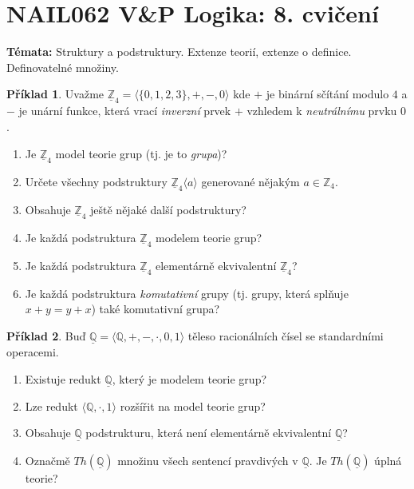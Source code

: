 \documentclass[a4paper]{article}
\theoremstyle{definition}
\newtheorem{problem}{Příklad}
\begin{document}
\section*{NAIL062 V\&P Logika: 8. cvičení}


\textbf{Témata:}
Struktury a podstruktury. Extenze teorií, extenze o definice. Definovatelné množiny.


\medskip\begin{problem}
    Uvažme $\underline{\mathbb{Z}}_4=\langle\{0,1,2,3\},+,-,0 \rangle$ kde $+$ je binární sčítání modulo $4$ a $-$ je unární funkce, která vrací \emph{inverzní} prvek $+$ vzhledem k \emph{neutrálnímu} prvku $0$.
    \begin{enumerate}[label=(\alph*),noitemsep,topsep=6pt]
        
        \item Je $\underline{\mathbb{Z}}_4$ model teorie grup (tj. je to \emph{grupa})?
        \item Určete všechny podstruktury $\underline{\mathbb{Z}}_4\langle a\rangle$ generované nějakým $a\in \mathbb{Z}_4$.
        \item Obsahuje $\underline{\mathbb{Z}}_4$ ještě nějaké další podstruktury?
        \item Je každá podstruktura $\underline{\mathbb{Z}}_4$ modelem teorie grup?
        \item Je každá podstruktura $\underline{\mathbb{Z}}_4$ elementárně ekvivalentní $\underline{\mathbb{Z}}_4$?
        \item Je každá podstruktura \emph{komutativní} grupy (tj. grupy, která splňuje $x+y=y+x$) také komutativní grupa?
    \end{enumerate}
\end{problem}
 
        
\medskip\begin{problem}
    Buď $\underline{\mathbb{Q}}=\langle\mathbb{Q},+,-,\cdot,0,1 \rangle$ těleso racionálních čísel se standardními operacemi.
    \begin{enumerate}[label=(\alph*),noitemsep,topsep=6pt]
                
        \item Existuje redukt $\underline{\mathbb{Q}}$, který je modelem teorie grup?
        \item Lze redukt $\langle\mathbb{Q},\cdot,1\rangle$ rozšířit na model teorie grup?
        \item Obsahuje $\underline{\mathbb{Q}}$ podstrukturu, která není elementárně ekvivalentní $\underline{\mathbb{Q}}$?
        \item Označmě $Th(\underline{\mathbb{Q}})$ množinu všech sentencí pravdivých v $\underline{\mathbb{Q}}$. Je $Th(\underline{\mathbb{Q}})$ úplná teorie?
    \end{enumerate}
\end{problem}
    
\end{document}
